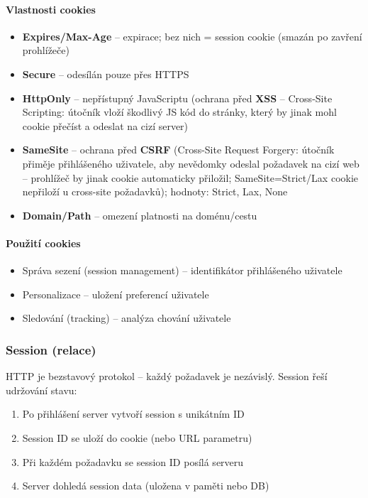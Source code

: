 \paragraph{Vlastnosti cookies}
\begin{itemize}
  \item \textbf{Expires/Max-Age} -- expirace; bez nich = session cookie (smazán po zavření prohlížeče)
  \item \textbf{Secure} -- odesílán pouze přes HTTPS
  \item \textbf{HttpOnly} -- nepřístupný JavaScriptu (ochrana před \textbf{XSS} --
    Cross-Site Scripting: útočník vloží škodlivý JS kód do stránky, který by jinak mohl
    cookie přečíst a odeslat na cizí server)
  \item \textbf{SameSite} -- ochrana před \textbf{CSRF} (Cross-Site Request Forgery: útočník
    přiměje přihlášeného uživatele, aby nevědomky odeslal požadavek na cizí web -- prohlížeč
    by jinak cookie automaticky přiložil; SameSite=Strict/Lax cookie nepřiloží u cross-site
    požadavků); hodnoty: Strict, Lax, None
  \item \textbf{Domain/Path} -- omezení platnosti na doménu/cestu
\end{itemize}

\paragraph{Použití cookies}
\begin{itemize}
  \item Správa sezení (session management) -- identifikátor přihlášeného uživatele
  \item Personalizace -- uložení preferencí uživatele
  \item Sledování (tracking) -- analýza chování uživatele
\end{itemize}

\subsubsection{Session (relace)}

HTTP je bezstavový protokol -- každý požadavek je nezávislý. Session řeší udržování stavu:
\begin{enumerate}
  \item Po přihlášení server vytvoří session s unikátním ID
  \item Session ID se uloží do cookie (nebo URL parametru)
  \item Při každém požadavku se session ID posílá serveru
  \item Server dohledá session data (uložena v paměti nebo DB)
\end{enumerate}

